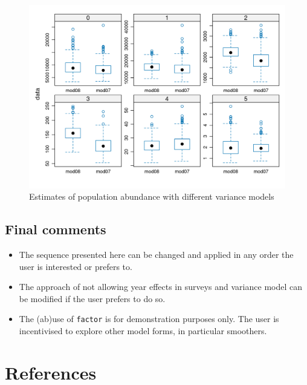 \documentclass[
]{book}
\providecommand{\tightlist}{%
  \setlength{\itemsep}{0pt}\setlength{\parskip}{0pt}}
\begin{document}
\begin{figure}
\centering
\includegraphics{_bookdown_files/_main_files/figure-html/vage-1.png}
\caption{\label{fig:vage}Estimates of population abundance with different variance models}
\end{figure}

\hypertarget{final-comments}{%
\section{Final comments}\label{final-comments}}

\begin{itemize}
\tightlist
\item
  The sequence presented here can be changed and applied in any order the user is interested or prefers to.
\item
  The approach of not allowing year effects in surveys and variance model can be modified if the user prefers to do so.
\item
  The (ab)use of \texttt{factor} is for demonstration purposes only. The user is incentivised to explore other model forms, in particular smoothers.
\end{itemize}

\hypertarget{references}{%
\chapter{References}\label{references}}
\end{document}
